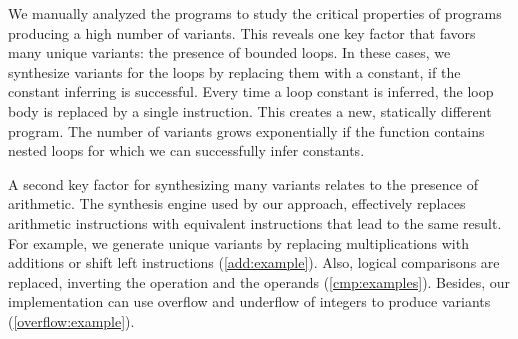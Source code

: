 We manually analyzed the programs to study the critical properties of programs producing a high number of variants.
This reveals one key factor that favors many unique variants: the presence of bounded loops. In these cases, we synthesize variants for the loops by replacing them with a constant, if the constant inferring is successful. Every time a loop constant is inferred, the loop body is replaced by a single instruction. This creates a new, statically different program. The number of variants grows exponentially if the function contains nested loops for which we can successfully infer constants. 

A second key factor for synthesizing many variants relates to the presence of arithmetic. The synthesis engine used by our approach, effectively replaces arithmetic instructions with equivalent instructions that lead to the same result. For example, we generate unique variants by replacing multiplications with additions or shift left instructions (\autoref{add:example}). Also, logical comparisons are replaced, inverting the operation and the operands (\autoref{cmp:examples}). Besides, our implementation can use overflow and underflow of integers to produce variants (\autoref{overflow:example}).

